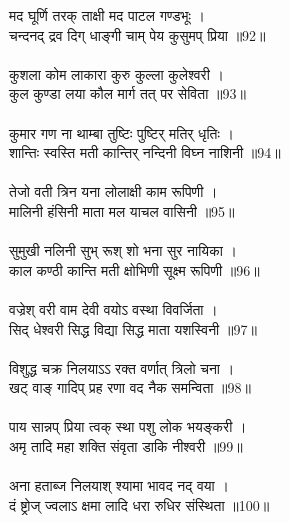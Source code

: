 मद घूर्णि तरक् ताक्षी मद पाटल गण्डभूः ।\\
चन्दनद् द्रव दिग् धाङ्गी चाम् पेय कुसुमप् प्रिया ॥92॥\\
\\
कुशला कोम लाकारा कुरु कुल्ला कुलेश्वरी ।\\
कुल कुण्डा लया कौल मार्ग तत् पर सेविता ॥93॥\\
\\
कुमार गण ना थाम्बा तुष्टिः पुष्टिर् मतिर् धृतिः ।\\
शान्तिः स्वस्ति मती कान्तिर् नन्दिनी विघ्न नाशिनी ॥94॥\\
\\
तेजो वती त्रिन यना लोलाक्षी काम रूपिणी ।\\
मालिनी हंसिनी माता मल याचल वासिनी ॥95॥\\
\\
सुमुखी नलिनी सुभ् रूश् शो भना सुर नायिका ।\\
काल कण्ठी कान्ति मती क्षोभिणी सूक्ष्म रूपिणी ॥96॥\\
\\
वज्रेश् वरी वाम देवी वयोऽ वस्था विवर्जिता ।\\
सिद् धेश्वरी सिद्ध विद्या सिद्ध माता यशस्विनी ॥97॥\\
\\
विशुद्ध चक्र निलयाऽऽ रक्त वर्णात् त्रिलो चना ।\\
खट् वाङ् गादिप् प्रह रणा वद नैक समन्विता ॥98॥\\
\\
पाय सान्नप् प्रिया त्वक् स्था पशु लोक भयङ्करी ।\\
अमृ तादि महा शक्ति संवृता डाकि नीश्वरी ॥99॥\\
\\
अना हताब्ज निलयाश् श्यामा भावद नद् वया ।\\
दं ष्ट्रोज् ज्वलाऽ क्षमा लादि धरा रुधिर संस्थिता ॥100॥\\
